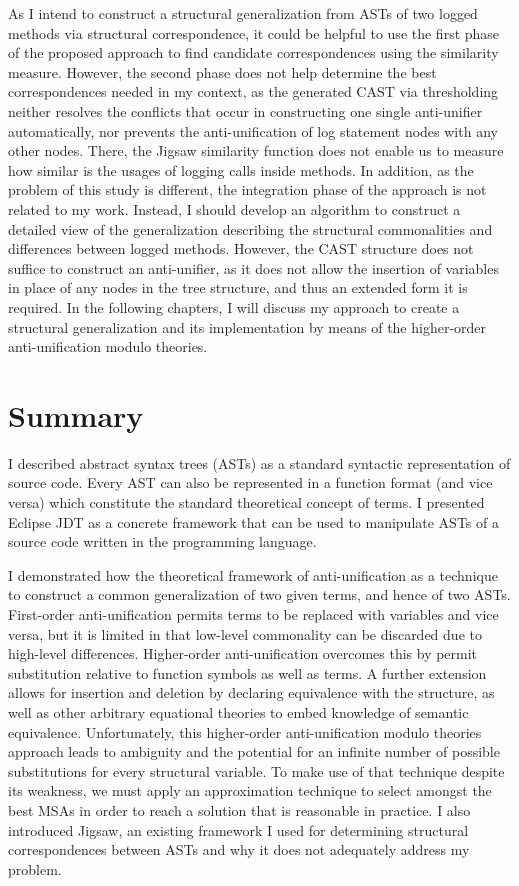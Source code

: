 As I intend to construct a structural generalization from ASTs of two logged methods via structural correspondence, it could be helpful to use the first phase of the proposed approach to find candidate correspondences using the similarity measure. However, the second phase does not help determine the best correspondences needed in my context, as the generated CAST via thresholding neither resolves the conflicts that occur in constructing one single anti-unifier automatically, nor prevents the anti-unification of log statement nodes with any other nodes. There, the Jigsaw similarity function does not enable us to measure how similar is the usages of logging calls inside methods. In addition, as the problem of this study is different, the integration phase of the approach is not related to my work. Instead, I should develop an algorithm to construct a detailed view of the generalization describing the structural commonalities and differences between logged methods. However, the CAST structure does not suffice to construct an anti-unifier, as it does not allow the insertion of variables in place of any nodes in the tree structure, and thus an extended form it is required. In the following chapters, I will discuss my approach to create a structural generalization and its implementation by means of the higher-order anti-unification modulo theories.


\section{Summary}  \label{summary}
I described abstract syntax trees (ASTs) as a standard syntactic representation of source code. Every AST can also be represented in a function format (and vice versa) which constitute the standard theoretical concept of terms. I presented Eclipse JDT as a concrete framework that can be used to manipulate ASTs of a source code written in the  programming language.

I demonstrated how the theoretical framework of anti-unification as a technique to construct a common generalization of two given terms, and hence of two ASTs.  First-order anti-unification permits terms to be replaced with variables and vice versa, but it is limited in that low-level commonality can be discarded due to high-level differences.  Higher-order anti-unification overcomes this by permit substitution relative to function symbols as well as terms. A further extension allows for insertion and deletion by declaring equivalence with the \NIL{} structure, as well as other arbitrary equational theories to embed knowledge of semantic equivalence.  Unfortunately, this higher-order anti-unification modulo theories approach leads to ambiguity and the potential for an infinite number of possible substitutions for every structural variable.  To make use of that technique despite its weakness, we must apply an approximation technique to select amongst the best MSAs in order to reach a solution that is reasonable in practice. I also introduced Jigsaw, an existing framework I used for determining structural correspondences between ASTs and why it does not adequately address my problem.
